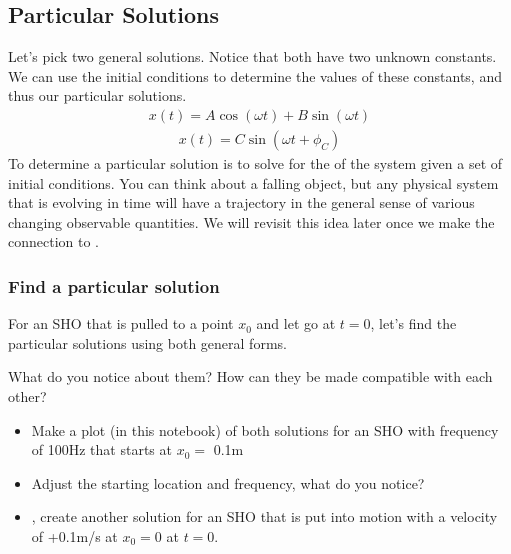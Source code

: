 \documentclass[letterpaper,10pt,english]{jupyterBook}
\begin{document}
\subsection{Particular Solutions}
\label{\detokenize{content/1_mechanics/sho/notes-SHO:particular-solutions}}
\sphinxAtStartPar
Let’s pick two general solutions. Notice that both have two unknown constants. We can use the initial conditions to determine the values of these constants, and thus our particular solutions.
\begin{equation*}
\begin{split}x(t) = A\cos(\omega t) + B\sin(\omega t)\end{split}
\end{equation*}\begin{equation*}
\begin{split}x(t) = C\sin(\omega t + \phi_C)\end{split}
\end{equation*}
\sphinxAtStartPar
To determine a particular solution is to solve for the  of the system given a set of initial conditions. You can think about a falling object, but any physical system that is evolving in time will have a trajectory in the general sense of various changing observable quantities. We will revisit this idea later once we make the connection to .


\subsubsection{Find a particular solution}
\label{\detokenize{content/1_mechanics/sho/notes-SHO:find-a-particular-solution}}
\sphinxAtStartPar
For an SHO that is pulled to a point \(x_0\) and let go at \(t=0\), let’s find the particular solutions using both general forms.

\sphinxAtStartPar
{} What do you notice about them? How can they be made compatible with each other?
\begin{itemize}
\item {} 
\sphinxAtStartPar
Make a plot (in this notebook) of both solutions for an SHO with frequency of 100Hz that starts at \(x_0 =\) 0.1m

\item {} 
\sphinxAtStartPar
Adjust the starting location and frequency, what do you notice?

\item {} 
\sphinxAtStartPar
{}, create another solution for an SHO that is put into motion with a velocity of +0.1m/s at \(x_0=0\) at \(t=0\).

\end{itemize}
\end{document}
